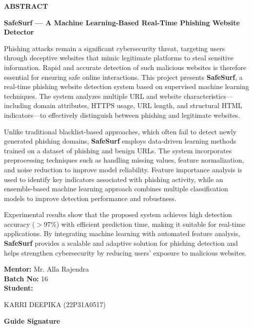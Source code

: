 \begin{center}
{\bfseries\fontsize{16}{18}\selectfont ABSTRACT}
\end{center}


\vspace{0.5cm}

\noindent
\textbf{SafeSurf — A Machine Learning-Based Real-Time Phishing Website Detector}

\vspace{0.5cm}

\noindent
Phishing attacks remain a significant cybersecurity threat, targeting users through deceptive websites that mimic legitimate platforms to steal sensitive information. Rapid and accurate detection of such malicious websites is therefore essential for ensuring safe online interactions. This project presents \textbf{SafeSurf}, a real-time phishing website detection system based on supervised machine learning techniques. The system analyzes multiple URL and website characteristics—including domain attributes, HTTPS usage, URL length, and structural HTML indicators—to effectively distinguish between phishing and legitimate websites.

\vspace{0.3cm}

\noindent
Unlike traditional blacklist-based approaches, which often fail to detect newly generated phishing domains, \textbf{SafeSurf} employs data-driven learning methods trained on a dataset of phishing and benign URLs. The system incorporates preprocessing techniques such as handling missing values, feature normalization, and noise reduction to improve model reliability. Feature importance analysis is used to identify key indicators associated with phishing activity, while an ensemble-based machine learning approach combines multiple classification models to improve detection performance and robustness.

\vspace{0.3cm}

\noindent
Experimental results show that the proposed system achieves high detection accuracy ($> 97\%$) with efficient prediction time, making it suitable for real-time applications. By integrating machine learning with automated feature analysis, \textbf{SafeSurf} provides a scalable and adaptive solution for phishing detection and helps strengthen cybersecurity by reducing users’ exposure to malicious websites.

\vspace{1cm}

\noindent
\textbf{Mentor:} Mr. Alla Rajendra\\
\textbf{Batch No:} 16\\
\textbf{Student:}

\vspace{0.2cm}

\noindent
KARRI DEEPIKA (22P31A0517)

\vspace{1.5cm}

\begin{flushright}
\textbf{Guide Signature}
\end{flushright}